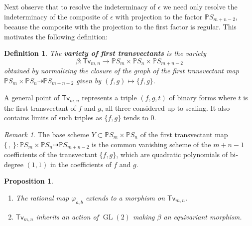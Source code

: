 \documentclass[reqno, 11pt]{amsart}
\theoremstyle{plain}
\newtheorem{proposition}[theorem]{Proposition}
\newtheorem{definition}[theorem]{Definition}
\theoremstyle{remark}
\newtheorem{remark}[theorem]{Remark}
\renewcommand{\P}{\mathbb{P}}
\DeclareMathOperator{\GL}{GL}
\newcommand{\transvectant}{\mathsf{Tv}}
\begin{document}
Next observe that to resolve the indeterminacy of $\epsilon$ we need only resolve the indeterminacy of the composite of $\epsilon$ with projection to the factor $\P S_{m+n-2}$, because the composite with the projection to the first factor is regular.  This motivates the following definition:


\begin{definition}
    \label{definition:transvectantvariety}
    The \textbf{variety of first transvectants} is the variety 
    \begin{equation}\label{equation:beta}
    \beta: \transvectant_{m,n} \to \P S_{m} \times \P S_{n} \times \P S_{m+n-2}
    \end{equation} obtained by normalizing the closure of the graph of the first transvectant map $\P S_{m} \times \P S_{n} \dashrightarrow \P S_{m+n-2}$ given by $(f,g) \mapsto \{f,g\}$. 
\end{definition}

A general point of $\transvectant_{m,n}$ represents a triple $(f,g,t)$ of binary forms where $t$ is the first transvectant of $f$ and $g$, all three considered up to scaling.  It also contains limits of such triples as $\{f,g\}$ tends to $0$.

\begin{remark}
    \label{remark:schemestructure}
    The base scheme $Y \subset \P S_{m} \times \P S_{n}$ of the first transvectant map $\{\,,\,\}: \P S_{m} \times \P S_{n} \dashrightarrow \P S_{m+n-2}$ is the common vanishing scheme of the $m+n-1$ coefficients of the transvectant $\{f,g\}$, which are quadratic polynomials of bi-degree $(1,1)$ in the coefficients of $f$ and $g$. 
\end{remark}


\begin{proposition}
    \label{proposition:clebsch-resolved}
    \begin{enumerate}
        \item The rational map $\varphi_{a,b}$ extends to a morphism on $\transvectant_{m,n}$.
        \item $\transvectant_{m,n}$ inherits an action of $\GL(2)$ making $\beta$ an equivariant morphism.
    \end{enumerate}
\end{proposition}
\end{document}
